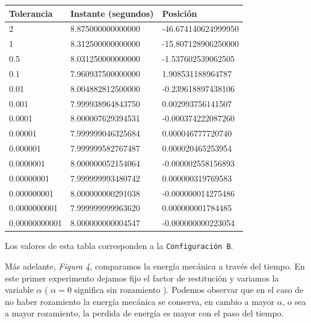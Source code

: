 \documentclass[a4paper]{article}
\begin{document}
\vspace{2em}
\begin{center}
\begin{tabular}{|l|l|l|}
  \hline
  Tolerancia & Instante (segundos) & Posición \\
  \hline
  2 & 8.875000000000000 & -46.674140624999950 \\
  1 &  8.312500000000000 & -15.807128906250000 \\
  0.5 & 8.031250000000000 & -1.537602539062505 \\
  0.1 & 7.960937500000000 & 1.908531188964787 \\
  0.01 & 8.004882812500000 & -0.239618897438106 \\
  0.001 & 7.999938964843750 & 0.002993756141507 \\
  0.0001 & 8.000007629394531 & -0.000374222087260 \\
  0.00001 & 7.999999046325684 & 0.000046777720740 \\
  0.000001 & 7.999999582767487 & 0.000020465253954 \\
  0.0000001 & 8.000000052154064 & -0.000002558156893 \\
  0.00000001 & 7.999999993480742 & 0.000000319769583 \\
  0.000000001 & 8.000000000291038 & -0.000000014275486 \\
  0.0000000001 & 7.999999999963620 & 0.000000001784485 \\
  0.00000000001 & 8.000000000004547 & -0.000000000223054 \\
\hline
\end{tabular}
\end{center} 
\centerline{Los valores de esta tabla corresponden a la \texttt{Configuración B}. }
\vspace{1em}

	
Más adelante, \textit{Figura 4}, comparamos la energía mecánica a través del tiempo. En este primer experimento dejamos fijo el factor de restitución y variamos la variable $\alpha$  ( $\alpha = 0$ significa sin rozamiento ). Podemos observar que en el caso de no haber rozamiento la energía mecánica se conserva, en cambio a mayor $\alpha$, o sea a mayor rozamiento, la perdida de energía es mayor con el paso del tiempo. \\
\end{document}
